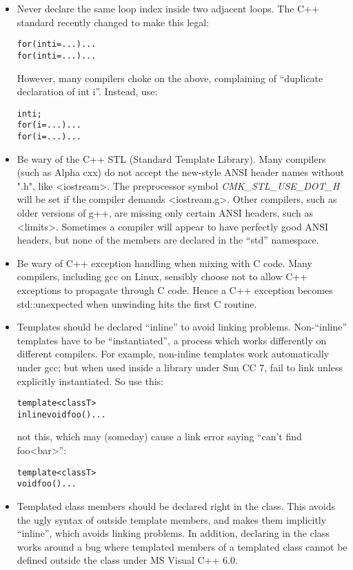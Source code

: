 \begin{itemize}

\item Never declare the same loop index inside two adjacent loops.
The C++ standard recently changed to make this legal:
\begin{alltt}
for (int i=...) ...
for (int i=...) ...
\end{alltt}
However, many compilers choke on the above, complaining of 
``duplicate declaration of int i''.  Instead, use:
\begin{alltt}
int i;
for (i=...) ...
for (i=...) ...
\end{alltt}

\item Be wary of the C++ STL (Standard Template Library).
Many compilers (such as Alpha cxx) do not accept the new-style 
ANSI header names without ".h", like <iostream>. The
preprocessor symbol {\em CMK\_STL\_USE\_DOT\_H} will be set if the 
compiler demands <iostream.g>.
Other compilers, such as older versions of g++, are missing 
only certain ANSI headers, such as <limits>.
Sometimes a compiler will appear to have perfectly good
ANSI headers, but none of the members are declared in the ``std''
namespace.

\item Be wary of C++ exception handling when mixing with C code. 
Many compilers, including gcc on Linux, sensibly choose not 
to allow C++ exceptions to propagate through C code.  Hence
a C++ exception becomes std::unexpected when unwinding hits
the first C routine.

\item Templates should be declared ``inline'' to avoid linking problems.
Non-``inline'' templates have to be ``instantiated'',
a process which works differently on different compilers.
For example, non-inline templates work automatically under gcc;
but when used inside a library under Sun CC 7, fail to link
unless explicitly instantiated. So use this:
\begin{alltt}
template <class T>
inline void foo() {...}
\end{alltt}
not this, which may (someday) cause a link error saying ``can't find
foo<bar>'':
\begin{alltt}
template <class T>
void foo() {...}
\end{alltt}

\item Templated class members should be declared right in the class. 
This avoids the ugly syntax of outside template members, and 
makes them implicitly ``inline'', which avoids linking problems.
In addition, declaring in the class works around a bug where
templated members of a templated class cannot be defined outside the 
class under MS Visual C++ 6.0.


\end{itemize}

